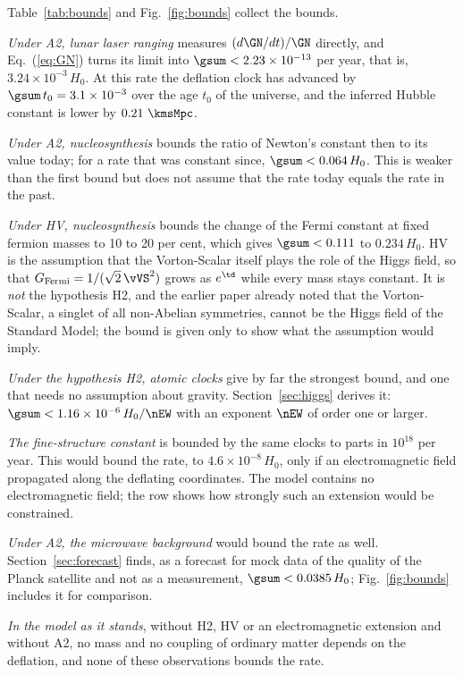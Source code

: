 Table~\ref{tab:bounds} and Fig.~\ref{fig:bounds} collect the bounds.

\emph{Under A2, lunar laser ranging} measures $(d\GN/dt)/\GN$ directly, and Eq.~(\ref{eq:GN}) turns
its limit into $\gsum<2.23\times10^{-13}$ per year, that is, $3.24\times10^{-3}\,H_0$. At this rate
the deflation clock has advanced by $\gsum\,t_0=3.1\times10^{-3}$ over the age $t_0$ of the universe,
and the inferred Hubble constant is lower by $0.21~\kmsMpc$.

\emph{Under A2, nucleosynthesis} bounds the ratio of Newton's constant then to its value today; for
a rate that was constant since, $\gsum<0.064\,H_0$. This is weaker than the first bound but does not
assume that the rate today equals the rate in the past.

\emph{Under HV, nucleosynthesis} bounds the change of the Fermi constant at fixed fermion masses to
10 to 20 per cent, which gives $\gsum<0.111$ to $0.234\,H_0$. HV is the assumption that the
Vorton-Scalar itself plays the role of the Higgs field, so that
$G_{\mathrm{Fermi}}=1/(\sqrt2\,\vVS^{2})$ grows as $e^{\td}$ while every mass stays constant. It is
\emph{not} the hypothesis H2, and the earlier paper already noted that the Vorton-Scalar, a singlet
of all non-Abelian symmetries, cannot be the Higgs field of the Standard Model; the bound is given
only to show what the assumption would imply.

\emph{Under the hypothesis H2, atomic clocks} give by far the strongest bound, and one that needs no
assumption about gravity. Section~\ref{sec:higgs} derives it: $\gsum<1.16\times10^{-6}\,H_0/\nEW$
with an exponent $\nEW$ of order one or larger.

\emph{The fine-structure constant} is bounded by the same clocks to parts in $10^{18}$ per year.
This would bound the rate, to $4.6\times10^{-8}\,H_0$, only if an electromagnetic field propagated
along the deflating coordinates. The model contains no electromagnetic field; the row shows how
strongly such an extension would be constrained.

\emph{Under A2, the microwave background} would bound the rate as well. Section~\ref{sec:forecast}
finds, as a forecast for mock data of the quality of the Planck satellite and not as a measurement,
$\gsum<0.0385\,H_0$; Fig.~\ref{fig:bounds} includes it for comparison.

\emph{In the model as it stands}, without H2, HV or an electromagnetic extension and without A2, no
mass and no coupling of ordinary matter depends on the deflation, and none of these observations
bounds the rate.

